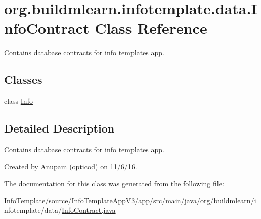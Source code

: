 \hypertarget{classorg_1_1buildmlearn_1_1infotemplate_1_1data_1_1InfoContract}{}\section{org.\+buildmlearn.\+infotemplate.\+data.\+Info\+Contract Class Reference}
\label{classorg_1_1buildmlearn_1_1infotemplate_1_1data_1_1InfoContract}


Contains database contracts for info template\textquotesingle{}s app.  


\subsection*{Classes}
\begin{DoxyCompactItemize}
\item 
class \hyperlink{classorg_1_1buildmlearn_1_1infotemplate_1_1data_1_1InfoContract_1_1Info}{Info}
\end{DoxyCompactItemize}


\subsection{Detailed Description}
Contains database contracts for info template\textquotesingle{}s app. 

Created by Anupam (opticod) on 11/6/16. 

The documentation for this class was generated from the following file\+:\begin{DoxyCompactItemize}
\item 
Info\+Template/source/\+Info\+Template\+App\+V3/app/src/main/java/org/buildmlearn/infotemplate/data/\hyperlink{InfoContract_8java}{Info\+Contract.\+java}\end{DoxyCompactItemize}

